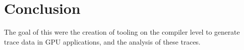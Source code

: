 \chapter{Conclusion}
The goal of this were the creation of tooling on the compiler level to generate trace data in GPU applications, and the analysis of these traces.